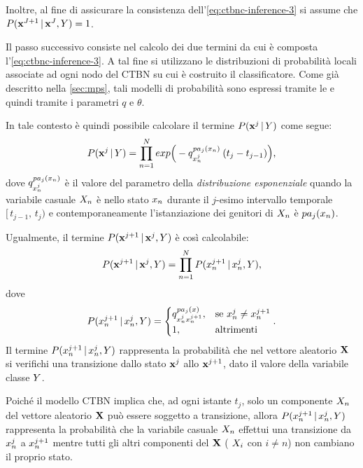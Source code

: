 Inoltre, al fine di assicurare la consistenza dell'\autoref{eq:ctbnc-inference-3} si assume che $P(\mathbf{x}^{J+1}\,\arrowvert\,\mathbf{x}^J,\mathnormal{Y})=1$.

Il passo successivo consiste nel calcolo dei due termini da cui è composta l'\autoref{eq:ctbnc-inference-3}. A tal fine si utilizzano le distribuzioni di probabilità locali associate ad ogni nodo del \acs{CTBN} su cui è costruito il classificatore. Come già descritto nella \autoref{sec:mps}, tali modelli di probabilità sono espressi tramite le \cim{} e quindi tramite i parametri $q$ e $\theta$.

In tale contesto è quindi possibile calcolare il termine $P(\mathbf{x}^j\,\arrowvert\,\mathnormal{Y})$ come segue:
\begin{equation}\label{eq:ctbnc-inference-4}
P(\mathbf{x}^j\,\arrowvert\,\mathnormal{Y})=\prod_{n=1}^N exp\Big(-q_{\mathnormal{x}_n^j}^{pa_j(\mathnormal{x}_n)}\:(t_j - t_{j-1})\Big)\text{,}
\end{equation}
dove $q_{\mathnormal{x}_n^j}^{pa_j(\mathnormal{x}_n)}$ è il valore del parametro della \emph{distribuzione esponenziale} quando la variabile casuale $\mathnormal{X}_n$ è nello stato $\mathnormal{x}_n$ durante il $j$-esimo intervallo temporale $[\,t_{j-1},\,t_j)$ e contemporaneamente l'istanziazione dei genitori di $\mathnormal{X}_n$ è $pa_j(\mathnormal{x}_n)$.

Ugualmente, il termine $P(\mathbf{x}^{j+1}\,\arrowvert\,\mathbf{x}^j,\mathnormal{Y})$ è così calcolabile:
\begin{equation}\label{eq:ctbnc-inference-5}
P(\mathbf{x}^{j+1}\,\arrowvert\,\mathbf{x}^j,\mathnormal{Y})=\prod_{n=1}^N P(\mathnormal{x}_n^{j+1}\,\arrowvert\,\mathnormal{x}_n^j,\mathnormal{Y})\text{,}
\end{equation}
dove
\begin{equation}\label{eq:ctbnc-inference-6}
P(\mathnormal{x}_n^{j+1}\,\arrowvert\,\mathnormal{x}_n^j,\mathnormal{Y})=
\begin{cases}
q_{\mathnormal{x}_n^j\mathnormal{x}_n^{j+1}}^{pa_j(\mathnormal{x})}, & \text{se } \mathnormal{x}_n^j \neq \mathnormal{x}_n^{j+1} \\
1, & \text{altrimenti}
\end{cases}\text{.}
\end{equation}
Il termine $P(\mathnormal{x}_n^{j+1}\,\arrowvert\,\mathnormal{x}_n^j,\mathnormal{Y})$ rappresenta la probabilità che nel vettore aleatorio $\mathbf{X}$ si verifichi una transizione dallo stato $\mathbf{x}^j$ allo $\mathbf{x}^{j+1}$, dato il valore della variabile classe $\mathnormal{Y}$.

Poiché il modello \acs{CTBN} implica che, ad ogni istante $t_j$, solo un componente $\mathnormal{X}_n$ del vettore aleatorio $\mathbf{X}$ può essere soggetto a transizione, allora $P(\mathnormal{x}_n^{j+1}\,\arrowvert\,\mathnormal{x}_n^j,\mathnormal{Y})$ rappresenta la probabilità che la variabile casuale $\mathnormal{X}_n$ effettui una transizione da $\mathnormal{x}_n^j$ a $\mathnormal{x}_n^{j+1}$ mentre tutti gli altri componenti del  $\mathbf{X}$ (\ie{} $\mathnormal{X}_i$ con $i \neq n$) non cambiano il proprio stato.

